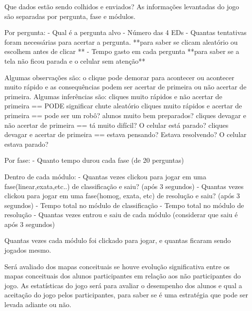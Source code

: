 Que dados estão sendo colhidos e enviados? As informações levantadas do jogo são separadas por pergunta, fase e módulos.

Por pergunta:
	- Qual é a pergunta alvo
	- Número das 4 EDs
	- Quantas tentativas foram necessárias para acertar a pergunta. **para saber se clicam aleatório ou escolhem antes de clicar **
	- Tempo gasto em cada pergunta  **para saber se a tela não ficou parada e o celular sem atenção**

	Algumas observações são: o clique pode demorar para acontecer ou acontecer muito rápido e as consequências podem ser acertar de primeira ou não acertar de primeira.
	Algumas inferências são: 
	cliques muito rápidos e não acertar de primeira == PODE significar chute aleatório
	cliques muito rápidos e acertar de primeira == pode ser um robô? alunos muito bem preparados?
	cliques devagar e não acertar de primeira == tá muito difícil? O celular está parado? 
	cliques devagar e acertar de primeira == estava pensando? Estava resolvendo? O celular estava parado?

Por fase:
	- Quanto tempo durou cada fase (de 20 perguntas)

Dentro de cada módulo:
	- Quantas vezes clickou para jogar em uma fase(linear,exata,etc..) de classificação e saiu? (após 3 segundos)
	- Quantas vezes clickou para jogar em uma fase(homog, exata, etc) de resolução e saiu? (após 3 segundos)
	- Tempo total no módulo de classificação
	- Tempo total no módulo de resolução
	- Quantas vezes entrou e saiu de cada módulo (considerar que saiu é após 3 segundos)


Quantas vezes cada módulo foi clickado para jogar, e quantas ficaram sendo jogados mesmo.

Será avaliado dos mapas conceituais se houve evolução significativa entre os mapas conceituais dos alunos participantes em relação aos não participantes do jogo.
As estatísticas do jogo será para avaliar o desempenho dos alunos e qual a aceitação do jogo pelos participantes, para saber se é uma estratégia que pode ser levada adiante ou não.
